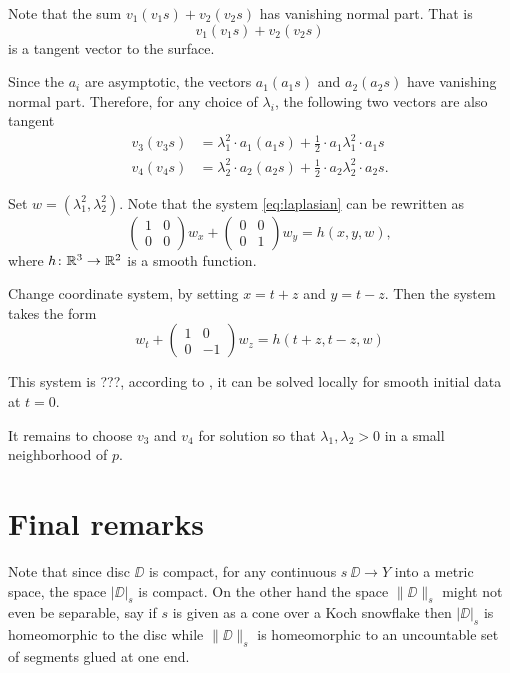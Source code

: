\documentclass[a4paper,10pt]{amsart}
\begin{document}
Note that the sum $v_1(v_1s)+v_2(v_2s)$ has vanishing normal part.
That is \[v_1(v_1s)+v_2(v_2s)\] is a tangent vector to the surface.

Since the $a_i$ are asymptotic,
the vectors $a_1(a_1s)$ and $a_2(a_2s)$ have vanishing normal part.
Therefore, for any choice of $\lambda_i$,
the following two vectors are also tangent
\begin{align*}
v_3(v_3s)&=\lambda_1^2\cdot a_1(a_1s)+\tfrac12\cdot a_1\lambda_1^2\cdot a_1s
\\
v_4(v_4s)&=\lambda_2^2\cdot a_2(a_2s)+\tfrac12\cdot a_2\lambda_2^2\cdot a_2s.
\end{align*}

Set $w=(\lambda_1^2,\lambda_2^2)$.
Note that the system \ref{eq:laplasian} can be rewritten as 
\[\left(\begin{smallmatrix}
   1&0\\0&0
  \end{smallmatrix}\right)
w_x
+
\left(\begin{smallmatrix}
   0&0\\0&1
  \end{smallmatrix}\right)
w_y=h(x,y,w),\]
where $h\colon\mathbb{R}^3\to\mathbb{R}^2$ is a smooth function.

Change coordinate system, by setting $x=t+z$ and $y=t-z$.
Then the system takes the form 
\[w_t+\left(\begin{smallmatrix}
   1&0\\0&-1
  \end{smallmatrix}\right)
w_z=h(t+z,t-z,w)\]

This system is ???,
according to \cite[Theorem 3.6]{bressan}, it can be solved locally for smooth initial data at $t=0$.

It remains to choose $v_3$ and $v_4$ for solution so that $\lambda_1, \lambda_2>0$ in a small neighborhood of $p$.
\qeds


\section{Final remarks}

Note that since disc $\DD$ is compact, 
for any continuous $s\:\DD\to Y$ into a metric space,
the space $|\DD|_s$ is compact.
On the other hand the space $\|\DD\|_s$ might not even be separable,
say if $s$ is given as a cone over a Koch snowflake then 
$|\DD|_s$ is homeomorphic to the disc while $\|\DD\|_s$ is homeomorphic to an uncountable set of segments glued at one end.
\end{document}
